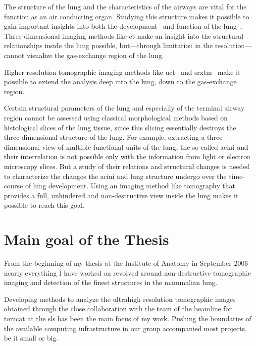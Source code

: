 The structure of the lung and the characteristics of the airways are vital for the function as an air conducting organ. Studying this structure makes it possible to gain important insights into both the development~\cite{Schittny2007a,Hyde2007} and function of the lung~\cite{Tsuda2002}. Three-dimensional imaging methods like \ac{ct} make an insight into the structural relationships inside the lung possible, but---through limitation in the resolution---cannot visualize the gas-exchange region of the lung.

Higher resolution tomographic imaging methods like \ac{uct}~\cite{Hoffman2005} and \ac{srxtm}~\cite{Bayat2006,Bayat2009,Mund2008,Schittny2008,Tsuda2008} make it possible to extend the analysis deep into the lung, down to the gas-exchange region.

Certain structural parameters of the lung and especially of the terminal airway region cannot be assessed using classical morphological methods based on histological slices of the lung tissue, since this slicing essentially destroys the three-dimensional structure of the lung. For example, extracting a three-dimensional view of multiple functional units of the lung, the so-called acini and their interrelation is not possible only with the information from light or electron microscopy slices. But a study of their relations and structural changes is needed to characterize the changes the acini and lung structure undergo over the time-course of lung development. Using an imaging method like tomography that provides a full, unhindered and non-destructive view inside the lung makes it possible to reach this goal.

\section{Main goal of the Thesis}
From the beginning of my thesis at the Institute of Anatomy in September 2006 nearly everything I have worked on revolved around non-destructive tomographic imaging and detection of the finest structures in the mammalian lung.

Developing methods to analyze the ultrahigh resolution tomographic images obtained through the close collaboration with the team of the beamline for \ac{tomcat} at the \ac{sls} has been the main focus of my work. Pushing the boundaries of the available computing infrastructure in our group accompanied most projects, be it small or big.

